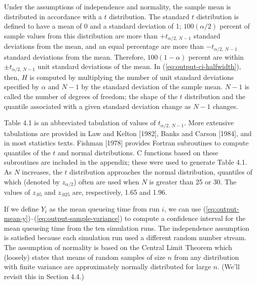 Under the assumptions of independence and normality, the sample mean is
distributed in accordance with a $t$ distribution. The standard $t$
distribution is defined to have a mean of 0 and a standard deviation of 1;
$100(\alpha/2)$ percent of sample values from this distribution are more than
$+t_{\alpha/2,\,N-1}$ standard deviations from the mean, and an equal
percentage are more than $-t_{\alpha/2,\,N-1}$ standard deviations from the
mean. Therefore, $100(1-\alpha)$ percent are within
$\pm t_{\alpha/2,\,N-1}$ unit standard deviations of the mean. In
(\ref{eq:output-ci-halfwidth}), then, $H$ is computed by multiplying the
number of unit standard deviations specified by $\alpha$ and $N-1$ by the
standard deviation of the sample mean. $N-1$ is called the number of degrees
of freedom; the shape of the $t$ distribution and the quantile associated
with a given standard deviation change as $N-1$ changes.

Table 4.1 is an abbreviated tabulation of values of $t_{\alpha/2,\,N-1}$. More
extensive tabulations are provided in Law and Kelton [1982], Banks and Carson
[1984], and in most statistics texts. Fishman [1978] provides Fortran
subroutines to compute quantiles of the $t$ and normal distributions. C
functions based on these subroutines are included in the appendix; these were
used to generate Table 4.1. As $N$ increases, the $t$ distribution approaches
the normal distribution, quantiles of which (denoted by $z_{\alpha/2}$) often
are used when $N$ is greater than 25 or 30. The values of $z_{.05}$ and
$z_{.025}$ are, respectively, 1.65 and 1.96.



If we define $Y_i$ as the mean queueing time from run $i$, we can use
(\ref{eq:output-mean-y})--(\ref{eq:output-sample-variance}) to compute a
confidence interval for the mean queueing time from the ten simulation runs.
The independence assumption is satisfied because each simulation run used a
different random number stream. The assumption of normality is based on the
Central Limit Theorem which (loosely) states that means of random samples of
size $n$ from any distribution with finite variance are approximately normally
distributed for large $n$. (We'll revisit this in Section 4.4.)

